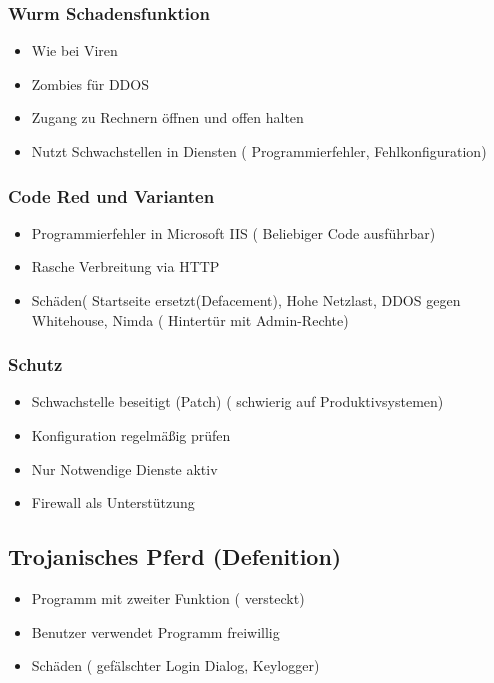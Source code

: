 \subsubsection*{ Wurm Schadensfunktion}
\begin{itemize}
	\item Wie bei Viren
	\item Zombies für DDOS
	\item Zugang zu Rechnern öffnen und offen halten
	\item Nutzt Schwachstellen in Diensten ( Programmierfehler, Fehlkonfiguration)
\end{itemize}

\subsubsection*{ Code Red und Varianten}
\begin{itemize}
	\item Programmierfehler in Microsoft IIS ( Beliebiger Code ausführbar)
	\item Rasche Verbreitung via HTTP
	\item Schäden( Startseite ersetzt(Defacement), Hohe Netzlast, DDOS gegen Whitehouse, Nimda ( Hintertür mit Admin-Rechte)
\end{itemize}

\subsubsection*{ Schutz }
\begin{itemize}
	\item Schwachstelle beseitigt (Patch) ( schwierig auf Produktivsystemen)
	\item Konfiguration regelmäßig prüfen
	\item Nur Notwendige Dienste aktiv
	\item Firewall als Unterstützung
\end{itemize}


	\subsection*{Trojanisches Pferd (Defenition)}
\begin{itemize}
	\item Programm mit zweiter Funktion ( versteckt)
	\item Benutzer verwendet Programm freiwillig
	\item Schäden ( gefälschter Login Dialog, Keylogger)
\end{itemize}

